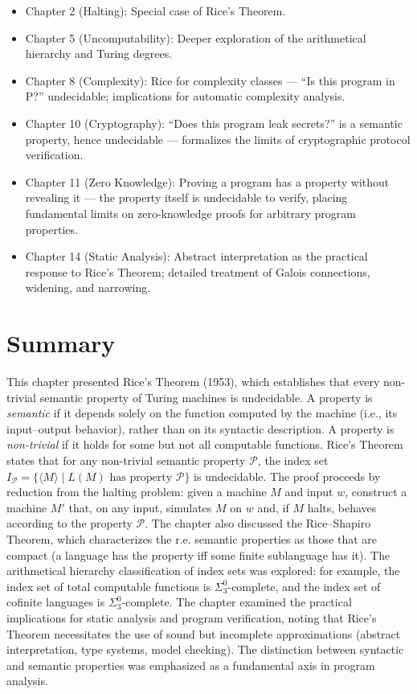 \begin{itemize}
\item Chapter 2 (Halting): Special case of Rice's Theorem.
\item Chapter 5 (Uncomputability): Deeper exploration of the arithmetical hierarchy and Turing degrees.
\item Chapter 8 (Complexity): Rice for complexity classes --- ``Is this program in P?'' undecidable; implications for automatic complexity analysis.
\item Chapter 10 (Cryptography): ``Does this program leak secrets?'' is a semantic property, hence undecidable --- formalizes the limits of cryptographic protocol verification.
\item Chapter 11 (Zero Knowledge): Proving a program has a property without revealing it --- the property itself is undecidable to verify, placing fundamental limits on zero-knowledge proofs for arbitrary program properties.
\item Chapter 14 (Static Analysis): Abstract interpretation as the practical response to Rice's Theorem; detailed treatment of Galois connections, widening, and narrowing.
\end{itemize}

\section{Summary}
\label{sec:rice:summary}

This chapter presented Rice's Theorem (1953), which establishes that every non-trivial semantic property of Turing machines is undecidable. A property is \emph{semantic} if it depends solely on the function computed by the machine (i.e., its input--output behavior), rather than on its syntactic description. A property is \emph{non-trivial} if it holds for some but not all computable functions. Rice's Theorem states that for any non-trivial semantic property $\mathcal{P}$, the index set $I_{\mathcal{P}} = \{ \langle M \rangle \mid L(M) \text{ has property } \mathcal{P} \}$ is undecidable. The proof proceeds by reduction from the halting problem: given a machine $M$ and input $w$, construct a machine $M'$ that, on any input, simulates $M$ on $w$ and, if $M$ halts, behaves according to the property $\mathcal{P}$. The chapter also discussed the Rice--Shapiro Theorem, which characterizes the r.e. semantic properties as those that are compact (a language has the property iff some finite sublanguage has it). The arithmetical hierarchy classification of index sets was explored: for example, the index set of total computable functions is $\Sigma^0_3$-complete, and the index set of cofinite languages is $\Sigma^0_3$-complete. The chapter examined the practical implications for static analysis and program verification, noting that Rice's Theorem necessitates the use of sound but incomplete approximations (abstract interpretation, type systems, model checking). The distinction between syntactic and semantic properties was emphasized as a fundamental axis in program analysis.

